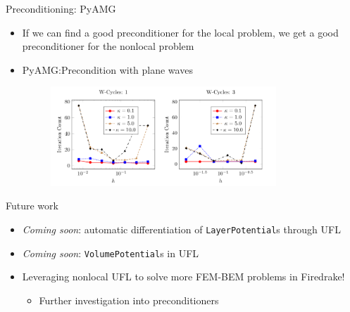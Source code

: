 \documentclass{beamer}
\begin{document}
\begin{frame}{Preconditioning: PyAMG}
    \begin{itemize}
        \item If we can find a good preconditioner for the local
            problem, we get a good preconditioner for the nonlocal
            problem
        \vfill
        \item<2->PyAMG:\@ Precondition with plane waves
            \begin{figure}[ht]
            \begin{center}
                \includegraphics[width=0.8\textwidth]{images/pyamg.png}
            \end{center}
            \end{figure}
    \end{itemize}
\end{frame}

\begin{frame}{Future work}
    \begin{itemize}
        \item<1-> \emph{Coming soon}: automatic differentiation of \texttt{LayerPotential}s through UFL
        \vfill
        \item<2-> \emph{Coming soon}: \texttt{VolumePotential}s in UFL
        \vfill
        \item<3-> Leveraging nonlocal UFL to solve more FEM-BEM problems in Firedrake!
            \begin{itemize}
                \item Further investigation into preconditioners
            \end{itemize}
    \end{itemize}
\end{frame}
\end{document}
